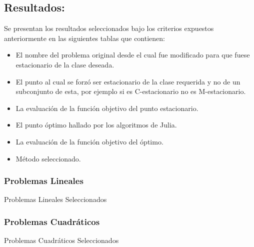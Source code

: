 \subsection{Resultados:}
Se presentan los resultados seleccionados bajo los criterios expuestos anteriormente en las siguientes tablas que contienen:
\begin{itemize}
    \item El nombre del problema original desde el cual fue modificado para que fuese estacionario de la clase deseada. 
    \item El punto al cual se forzó ser estacionario de la clase requerida y no de un subconjunto de esta, por ejemplo si es C-estacionario no es M-estacionario.
    \item La evaluación de la función objetivo del punto estacionario.
    \item El punto óptimo hallado por los algoritmos de Julia.
    \item La evaluación de la función objetivo del óptimo.
    \item Método seleccionado.
\end{itemize}

\subsubsection{Problemas Lineales} 
\begin{resultstable}{Problemas Lineales Seleccionados}
    \end{resultstable}



\subsubsection{Problemas Cuadráticos}

\begin{resultstable}{Problemas Cuadráticos Seleccionados}
\end{resultstable}

